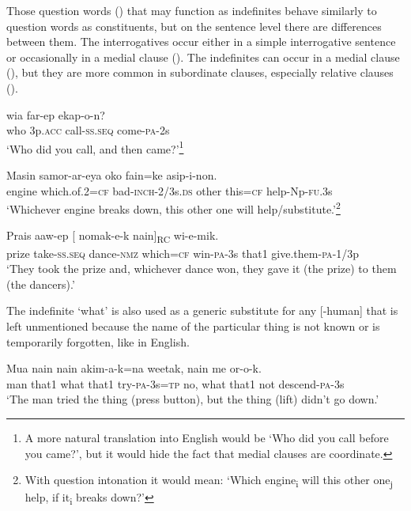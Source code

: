 Those question words () that may function as indefinites behave similarly to question words as  constituents, but on the sentence level there are differences between them. The interrogatives occur either in a simple interrogative sentence or occasionally in a medial clause (). The indefinites can occur in a medial clause (), but they are more common in subordinate clauses, especially relative clauses (). 

\ea%
\label{ex:x643}
\gll {} wia far-ep ekap-o-n? \\
who 3p.\textsc{acc} call-\textsc{ss}.\textsc{seq} come-\textsc{pa}-2s\\
\glt`Who did you call, and then came?'\footnote{A more natural translation into English would be `Who did you call before you came?', but it would hide the fact that medial clauses are coordinate.}
\z

\ea%
\label{ex:x644}
\gll Masin  samor-ar-eya oko fain=ke asip-i-non.\\
engine which.of.2=\textsc{cf} bad-\textsc{inch}-2/3s.\textsc{ds} other this=\textsc{cf} help-Np-\textsc{fu}.3s\\
\glt`Whichever engine breaks down, this other one will help/substitute.'\footnote{With question intonation it would mean: `Which engine\textsubscript{i} will this other one\textsubscript{j} help, if it\textsubscript{i} breaks down?'}
\z

\ea%
\label{ex:x645}
\gll Prais aaw-ep [  nomak-e-k nain]\textsubscript{RC} wi-e-mik.\\
prize take-\textsc{ss}.\textsc{seq} dance-\textsc{nmz} which=\textsc{cf} win-\textsc{pa}-3s that1 give.them-\textsc{pa}-1/3p\\
\glt`They took the prize and, whichever dance won, they gave it (the prize) to them (the dancers).'
\z

The indefinite  `what' is also used as a generic substitute for any [\nobreakdash-human]  that is left unmentioned because the name of the particular thing is not known or is temporarily forgotten, like  in English.

\ea%
\label{ex:x646}
\gll Mua nain  nain akim-a-k=na weetak,   nain me or-o-k.\\
man that1 what that1 try-\textsc{pa}-3s=\textsc{tp} no, what that1 not descend-\textsc{pa}-3s\\
\glt`The man tried the thing (press button), but the thing (lift) didn't go down.'
\z

